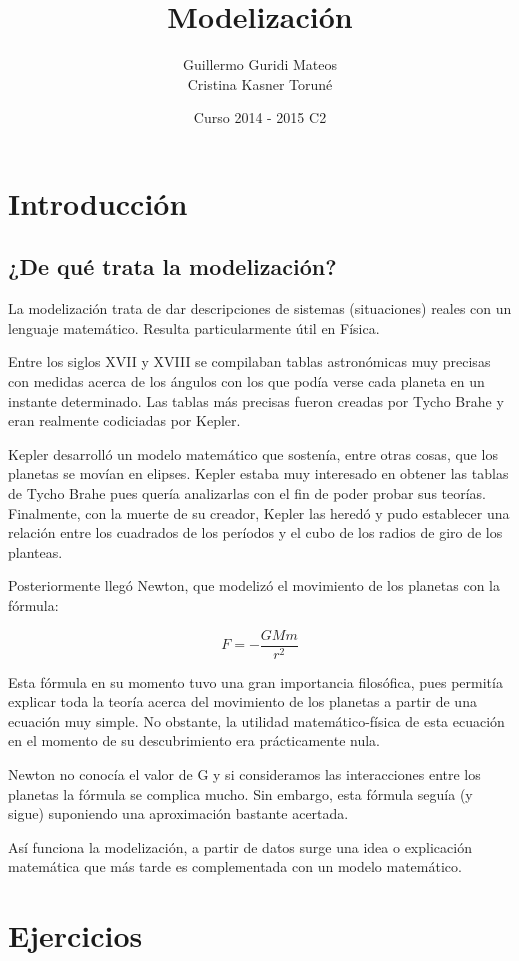 \documentclass{apuntes}
\title{Modelización}
\author{Guillermo Guridi Mateos\\Cristina Kasner Toruné}
\date{Curso 2014 - 2015 C2}
\begin{document}
\pagestyle{plain}
\maketitle

\tableofcontents
\newpage

\chapter{Introducción}

\section{¿De qué trata la modelización?}

La modelización trata de dar descripciones de sistemas (situaciones) reales con un lenguaje matemático. Resulta particularmente útil en Física.

Entre los siglos XVII y XVIII se compilaban tablas astronómicas muy precisas con medidas acerca de los ángulos con los que podía verse cada planeta en un instante determinado. Las tablas más precisas fueron creadas por Tycho Brahe y eran realmente codiciadas por Kepler.

Kepler desarrolló un modelo matemático que sostenía, entre otras cosas, que los planetas se movían en elipses. Kepler estaba muy interesado en obtener las tablas de Tycho Brahe pues quería analizarlas con el fin de poder probar sus teorías. Finalmente, con la muerte de su creador, Kepler las heredó y pudo establecer una relación entre los cuadrados de los períodos y el cubo de los radios de giro de los planteas.

Posteriormente llegó Newton, que modelizó el movimiento de los planetas con la fórmula:

$$F = - \frac{GMm}{r^2}$$

Esta fórmula en su momento tuvo una gran importancia filosófica, pues permitía explicar toda la teoría acerca del movimiento de los planetas a partir de una ecuación muy simple. No obstante, la utilidad matemático-física de esta ecuación en el momento de su descubrimiento era prácticamente nula.

Newton no conocía el valor de G y si consideramos las interacciones entre los planetas la fórmula se complica mucho. Sin embargo, esta fórmula seguía (y sigue) suponiendo una aproximación bastante acertada.

Así funciona la modelización, a partir de datos surge una idea o explicación matemática que más tarde es complementada con un modelo matemático.








\appendix

\chapter{Ejercicios}

\printindex
\end{document}
